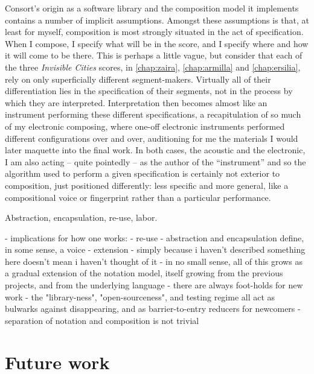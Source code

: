 Consort's origin as a software library and the composition model it implements
contains a number of implicit assumptions. Amongst these assumptions is
that, at least for myself, composition is most strongly situated in the act of
specification. When I compose, I specify what will be in the score, and I
specify where and how it will come to be there. This is perhaps a little vague,
but consider that each of the three \emph{Invisible Cities} scores, in
\autoref{chap:zaira}, \autoref{chap:armilla} and \autoref{chap:ersilia}, rely
on only superficially different segment-makers. Virtually all of their
differentiation lies in the specification of their segments, not in the process
by which they are interpreted. Interpretation then becomes almost like an
instrument performing these different specifications, a recapitulation of so
much of my electronic composing, where one-off electronic instruments performed
different configurations over and over, auditioning for me the materials I
would later maquette into the final work. In both cases, the acoustic and the
electronic, I am also acting -- quite pointedly -- as the author of the
\enquote{instrument} and so the algorithm used to perform a given specification
is certainly not exterior to composition, just positioned differently: less
specific and more general, like a compositional voice or fingerprint rather
than a particular performance.

Abstraction, encapsulation, re-use, labor.

\begin{markdown}
-   implications for how one works:
    -   re-use
        -   abstraction and encapsulation define, in some sense, a voice
    -   extension
        -   simply because i haven't described something here doesn't mean i
            haven't thought of it
        -   in no small sense, all of this grows as a gradual extension of the
            notation model, itself growing from the previous projects, and from
            the underlying language
        -   there are always foot-holds for new work
        -   the "library-ness", "open-sourceness", and testing regime all act
            as bulwarks against disappearing, and as barrier-to-entry reducers
            for newcomers
    -   separation of notation and composition is not trivial
\end{markdown}

\section{Future work}
\label{sec:future-work}


